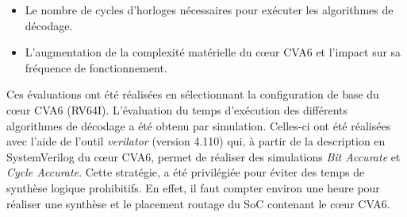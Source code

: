 \documentclass[../main.tex]{subfiles}
\begin{document}
\begin{itemize}
    \item Le nombre de cycles d'horloges nécessaires pour exécuter les algorithmes de décodage.
    \item L'augmentation de la complexité matérielle du cœur CVA6 et l'impact sur sa fréquence de fonctionnement.
\end{itemize}

Ces évaluations ont été réalisées en sélectionnant la configuration de base du cœur CVA6 (RV64I).
L'évaluation du temps d'exécution des différents algorithmes de décodage a été obtenu par simulation. 
Celles-ci ont été réalisées avec l'aide de l'outil \textit{verilator} (version 4.110) qui, à partir de la description en SystemVerilog du cœur CVA6, permet de réaliser des simulations \textit{Bit Accurate} et \textit{Cycle Accurate}.
Cette stratégie, a été privilégiée pour éviter des temps de synthèse logique prohibitifs. 
En effet, il faut compter environ une heure pour réaliser une synthèse et le placement routage du SoC contenant le cœur CVA6.
%
%
%
% 
% 
% 
\end{document}
